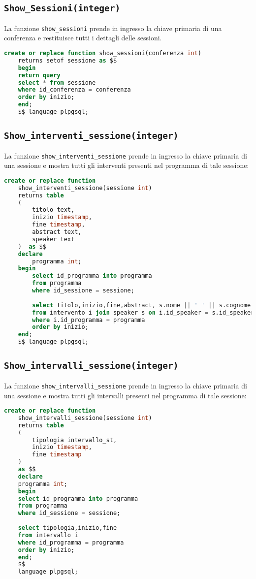 \subsection{\texttt{Show\_Sessioni(integer)}}
La funzione \texttt{show\_sessioni} prende in ingresso la chiave primaria di una conferenza e restituisce tutti i dettagli delle sessioni.
\begin{lstlisting}[language=SQL, style=mystyle]
	create or replace function show_sessioni(conferenza int)
	returns setof sessione as $$
	begin
	return query
	select * from sessione
	where id_conferenza = conferenza
	order by inizio;
	end;
	$$ language plpgsql;
\end{lstlisting}
\subsection{\texttt{Show\_interventi\_sessione(integer)}}
La funzione \texttt{show\_interventi\_sessione} prende in ingresso la chiave primaria di una sessione e mostra tutti gli interventi presenti nel programma di tale sessione:
\begin{lstlisting}[language=SQL,style=mystyle]
	create or replace function 
	show_interventi_sessione(sessione int)
	returns table
	(
		titolo text,
		inizio timestamp,
		fine timestamp,
		abstract text,
		speaker text
	)  as $$
	declare 
		programma int;
	begin
		select id_programma into programma
		from programma
		where id_sessione = sessione;
	
		select titolo,inizio,fine,abstract, s.nome || ' ' || s.cognome as speaker
		from intervento i join speaker s on i.id_speaker = s.id_speaker
		where i.id_programma = programma
		order by inizio;
	end;
	$$ language plpgsql;
\end{lstlisting}

\subsection{\texttt{Show\_intervalli\_sessione(integer)}}
La funzione \texttt{show\_intervalli\_sessione} prende in ingresso la chiave primaria di una sessione e mostra tutti gli intervalli presenti nel programma di tale sessione:
\begin{lstlisting}[language=SQL,style=mystyle]
	create or replace function 
	show_intervalli_sessione(sessione int)
	returns table
	(
		tipologia intervallo_st,
		inizio timestamp,
		fine timestamp
	)  
	as $$
	declare 
	programma int;
	begin
	select id_programma into programma
	from programma
	where id_sessione = sessione;
	
	select tipologia,inizio,fine
	from intervallo i
	where id_programma = programma
	order by inizio;
	end;
	$$ 
	language plpgsql;
\end{lstlisting}
